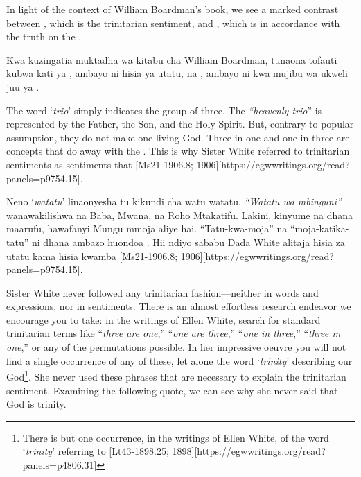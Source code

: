In light of the context of William Boardman’s book, we see a marked contrast between , which is the trinitarian sentiment, and , which is in accordance with the truth on the .


Kwa kuzingatia muktadha wa kitabu cha William Boardman, tunaona tofauti kubwa kati ya , ambayo ni hisia ya utatu, na , ambayo ni kwa mujibu wa ukweli juu ya .


The word ‘\textit{trio}’ simply indicates the group of three. The \textit{“heavenly trio}” is represented by the Father, the Son, and the Holy Spirit. But, contrary to popular assumption, they do not make one living God. Three-in-one and one-in-three are concepts that do away with the . This is why Sister White referred to trinitarian sentiments as sentiments that [Ms21-1906.8; 1906][https://egwwritings.org/read?panels=p9754.15].


Neno ‘\textit{watatu}’ linaonyesha tu kikundi cha watu watatu. \textit{“Watatu wa mbinguni”} wanawakilishwa na Baba, Mwana, na Roho Mtakatifu. Lakini, kinyume na dhana maarufu, hawafanyi Mungu mmoja aliye hai. “Tatu-kwa-moja” na “moja-katika-tatu” ni dhana ambazo huondoa . Hii ndiyo sababu Dada White alitaja hisia za utatu kama hisia kwamba [Ms21-1906.8; 1906][https://egwwritings.org/read?panels=p9754.15].


Sister White never followed any trinitarian fashion—neither in words and expressions, nor in sentiments. There is an almost effortless research endeavor we encourage you to take: in the writings of Ellen White, search for standard trinitarian terms like “\textit{three are one},” “\textit{one are three},” “\textit{one in three},” “\textit{three in one},” or any of the permutations possible. In her impressive oeuvre you will not find a single occurrence of any of these, let alone the word ‘\textit{trinity}’ describing our God\footnote{There is but one occurrence, in the writings of Ellen White, of the word ‘\textit{trinity}’ referring to [Lt43-1898.25; 1898][https://egwwritings.org/read?panels=p4806.31]}. She never used these phrases that are necessary to explain the trinitarian sentiment. Examining the following quote, we can see why she never said that God is trinity.


